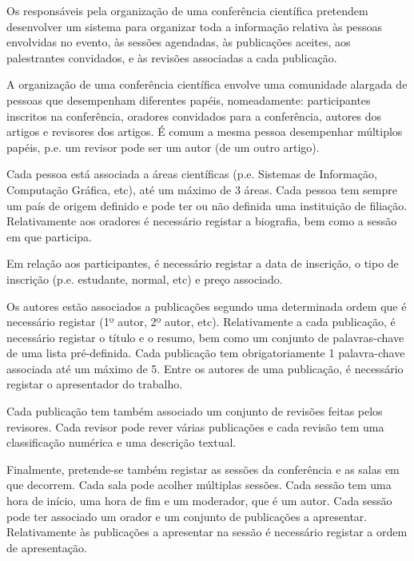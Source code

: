 \documentclass[type=recurso, year=2015/16]{bdad_exam}
\begin{document}
{Os responsáveis pela organização de uma conferência científica pretendem desenvolver um sistema para organizar toda a informação relativa às pessoas envolvidas no evento, às sessões agendadas, às publicações aceites, aos palestrantes convidados, e às revisões associadas a cada publicação.

A organização de uma conferência científica envolve uma comunidade alargada de pessoas que desempenham diferentes papéis, nomeadamente: participantes inscritos na conferência, oradores convidados para a conferência, autores dos artigos e revisores dos artigos. É comum a mesma pessoa desempenhar múltiplos papéis, p.e. um revisor pode ser um autor (de um outro artigo).

Cada pessoa está associada a áreas científicas (p.e. Sistemas de Informação, Computação Gráfica, etc), até um máximo de 3 áreas. Cada pessoa tem sempre um país de origem definido e pode ter ou não definida uma instituição de filiação. Relativamente aos oradores é necessário registar a biografia, bem como a sessão em que participa.

Em relação aos participantes, é necessário registar a data de inscrição, o tipo de inscrição (p.e. estudante, normal, etc) e preço associado.

Os autores estão associados a publicações segundo uma determinada ordem que é necessário registar (1º autor, 2º autor, etc). Relativamente a cada publicação, é necessário registar o título e o resumo, bem como um conjunto de palavras-chave de uma lista pré-definida. Cada publicação tem obrigatoriamente 1 palavra-chave associada até um máximo de 5. Entre os autores de uma publicação, é necessário registar o apresentador do trabalho.

Cada publicação tem também associado um conjunto de revisões feitas pelos revisores. Cada revisor pode rever várias publicações e cada revisão tem uma classificação numérica e uma descrição textual.

Finalmente, pretende-se também registar as sessões da conferência e as salas em que decorrem. Cada sala pode acolher múltiplas sessões. Cada sessão tem uma hora de início, uma hora de fim e um moderador, que é um autor. Cada sessão pode ter associado um orador e um conjunto de publicações a apresentar. Relativamente às publicações a apresentar na sessão é necessário registar a ordem de apresentação.

\ansseparator

}
\end{document}
